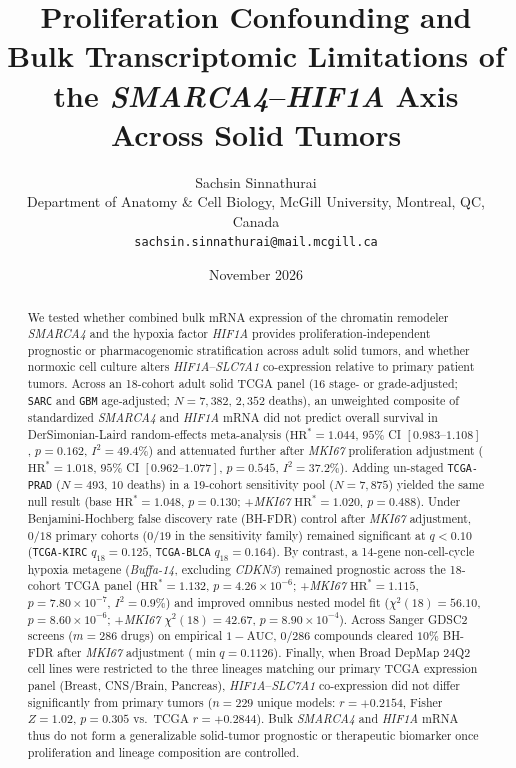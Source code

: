 \documentclass[11pt]{article}
\title{\textbf{Proliferation Confounding and Bulk Transcriptomic Limitations of the \textit{SMARCA4}--\textit{HIF1A} Axis Across Solid Tumors}}
\author{Sachsin Sinnathurai\\
Department of Anatomy \& Cell Biology, McGill University, Montreal, QC, Canada\\
\texttt{sachsin.sinnathurai@mail.mcgill.ca}}
\date{November 2026}
\begin{document}
\maketitle

\begin{abstract}
We tested whether combined bulk mRNA expression of the chromatin remodeler \textit{SMARCA4} and the hypoxia factor \textit{HIF1A} provides proliferation-independent prognostic or pharmacogenomic stratification across adult solid tumors, and whether normoxic cell culture alters \textit{HIF1A}--\textit{SLC7A1} co-expression relative to primary patient tumors. Across an 18-cohort adult solid TCGA panel (16 stage- or grade-adjusted; \texttt{SARC} and \texttt{GBM} age-adjusted; $N = 7,382$, $2,352$ deaths), an unweighted composite of standardized \textit{SMARCA4} and \textit{HIF1A} mRNA did not predict overall survival in DerSimonian-Laird random-effects meta-analysis ($\text{HR}^* = 1.044$, $95\%$ CI $[0.983\text{--}1.108]$, $p = 0.162$, $I^2 = 49.4\%$) and attenuated further after \textit{MKI67} proliferation adjustment ($\text{HR}^* = 1.018$, $95\%$ CI $[0.962\text{--}1.077]$, $p = 0.545$, $I^2 = 37.2\%$). Adding un-staged \texttt{TCGA-PRAD} ($N = 493$, $10$ deaths) in a 19-cohort sensitivity pool ($N = 7,875$) yielded the same null result (base $\text{HR}^* = 1.048$, $p = 0.130$; +\textit{MKI67} $\text{HR}^* = 1.020$, $p = 0.488$). Under Benjamini-Hochberg false discovery rate (BH-FDR) control after \textit{MKI67} adjustment, $0/18$ primary cohorts ($0/19$ in the sensitivity family) remained significant at $q < 0.10$ (\texttt{TCGA-KIRC} $q_{18} = 0.125$, \texttt{TCGA-BLCA} $q_{18} = 0.164$). By contrast, a 14-gene non-cell-cycle hypoxia metagene (\textit{Buffa-14}, excluding \textit{CDKN3}) remained prognostic across the 18-cohort TCGA panel ($\text{HR}^* = 1.132$, $p = 4.26 \times 10^{-6}$; +\textit{MKI67} $\text{HR}^* = 1.115$, $p = 7.80 \times 10^{-7}$, $I^2 = 0.9\%$) and improved omnibus nested model fit ($\chi^2(18) = 56.10$, $p = 8.60 \times 10^{-6}$; +\textit{MKI67} $\chi^2(18) = 42.67$, $p = 8.90 \times 10^{-4}$). Across Sanger GDSC2 screens ($m = 286$ drugs) on empirical $1 - \text{AUC}$, $0/286$ compounds cleared $10\%$ BH-FDR after \textit{MKI67} adjustment ($\min q = 0.1126$). Finally, when Broad DepMap 24Q2 cell lines were restricted to the three lineages matching our primary TCGA expression panel (Breast, CNS/Brain, Pancreas), \textit{HIF1A}--\textit{SLC7A1} co-expression did not differ significantly from primary tumors ($n = 229$ unique models: $r = +0.2154$, Fisher $Z = 1.02$, $p = 0.305$ vs.\ TCGA $r = +0.2844$). Bulk \textit{SMARCA4} and \textit{HIF1A} mRNA thus do not form a generalizable solid-tumor prognostic or therapeutic biomarker once proliferation and lineage composition are controlled.
\end{abstract}
\end{document}
